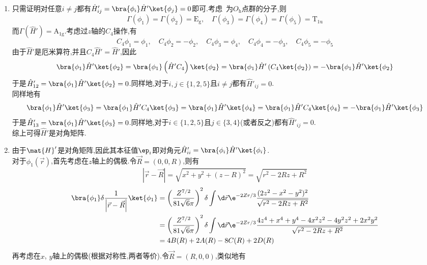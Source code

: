 \documentclass{ctexart}
\begin{document}
\begin{solution}
    \begin{enumerate}[label=\tbf{(\alph*)}]
        \item 只需证明对任意$i\neq j$都有$\hat{H}'_{ij}=\bra{\phi_i}\hat{H}'\ket{\phi_j}=0$即可.考虑~为$O_{\text{h}}$点群的分子,则
        \[\Gamma(\phi_1)=\Gamma(\phi_2)=\text{E}_{\text{g}},\quad\Gamma(\phi_3)=\Gamma(\phi_4)=\Gamma(\phi_5)=\text{T}_{1\text{u}}\]
        而$\Gamma(\hat{H}')=\text{A}_{1\text{g}}$.考虑过$z$轴的$C_4$操作,有
        \[C_4\phi_1=\phi_1,\quad C_4\phi_2=-\phi_2,\quad C_4\phi_3=\phi_4,\quad C_4\phi_4=-\phi_3,\quad C_4\phi_5=-\phi_5\]
        由于$\hat{H}'$是厄米算符,并且$C_4\hat{H}'=\hat{H}'$,因此
        \[\bra{\phi_1}\hat{H}'\ket{\phi_2}=\bra{\phi_1}\left(\hat{H}'C_4\right)\ket{\phi_2}=\bra{\phi_1}\hat{H}'\left(C_4\ket{\phi_2}\right)=-\bra{\phi_1}\hat{H}'\ket{\phi_2}\]
        于是$\hat{H}'_{12}=\bra{\phi_1}\hat{H}'\ket{\phi_2}=0$.同样地,对于$i,j\in\{1,2,5\}$且$i\neq j$都有$\hat{H}'_{ij}=0$.\\
        同样地有
        \[\bra{\phi_1}\hat{H}'\ket{\phi_3}=\bra{\phi_1}\hat{H}'C_4\ket{\phi_3}=\bra{\phi_1}\hat{H}'\ket{\phi_4}=\bra{\phi_1}\hat{H}'C_4\ket{\phi_4}=-\bra{\phi_1}\hat{H}'\ket{\phi_3}\]
        于是$\hat{H}'_{13}=\bra{\phi_1}\hat{H}'\ket{\phi_3}=0$.同样地,对于$i\in\{1,2,5\}$且$j\in\{3,4\}$(或者反之)都有$\hat{H}'_{ij}=0$.\\
        综上可得$\hat{H}'$是对角矩阵.
        \item 由于$\mat{H}'$是对角矩阵,因此其本征值$\ep_i$即对角元$\hat{H}'_{ii}=\bra{\phi_i}\hat{H}'\ket{\phi_i}$.\\
        对于$\phi_1(\vec{r})$,首先考虑在$z$轴上的偶极.令$\vec{R}=(0,0,R)$,则有
        \[\left|\vec{r}-\vec{R}\right|=\sqrt{x^2+y^2+(z-R)^2}=\sqrt{r^2-2Rz+R^2}\]
        \[\begin{aligned}
            \bra{\phi_1}\delta\dfrac{1}{\left|\vec{r}-\vec{R}\right|}\ket{\phi_1}
            &=\left(\dfrac{Z^{7/2}}{81\sqrt{6}\pi}\right)^2\delta\int\d\vec{r}\e^{-2Zr/3}\dfrac{(2z^2-x^2-y^2)^2}{\sqrt{r^2-2Rz+R^2}}\\
            &=\left(\dfrac{Z^{7/2}}{81\sqrt{6}\pi}\right)^2\delta\int\d\vec{r}\e^{-2Zr/3}\dfrac{4z^4+x^4+y^4-4x^2z^2-4y^2z^2+2x^2y^2}{\sqrt{r^2-2Rz+R^2}}\\
            &=4B(R)+2A(R)-8C(R)+2D(R)
        \end{aligned}\]
        再考虑在$x$, $y$轴上的偶极(根据对称性,两者等价).令$\vec{R}=(R,0,0)$,类似地有
        \[\begin{aligned}

\end{aligned}\]
\end{enumerate}
\end{solution}
\end{document}
